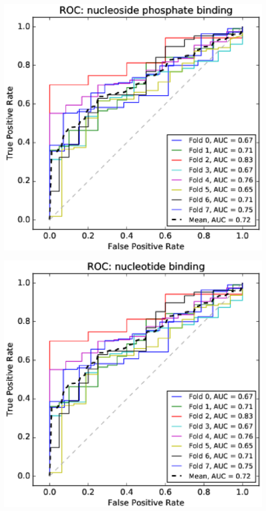 \documentclass[11pt,twoside,a4paper]{book}
\newenvironment{Figure}
  {\par\medskip\noindent\minipage{\linewidth}}
  {\endminipage\par\medskip}
\begin{document}
\begin{multicols}{2}
\begin{Figure}\begin{center}\includegraphics[width=\linewidth]{figures/roc_nucleoside_phosphate_binding}\label{fig:roc_nucleoside_phosphate_binding}\end{center}\end{Figure}
\begin{Figure}\begin{center}\includegraphics[width=\linewidth]{figures/roc_nucleotide_binding}\label{fig:roc_nucleotide_binding}\end{center}\end{Figure}

\end{multicols}
\end{document}
